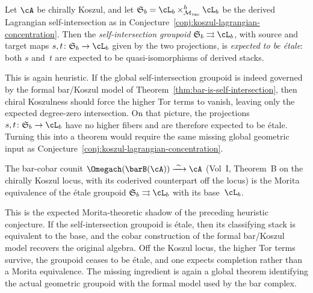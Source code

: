 \begin{conjecture}
\label{conj:etale-groupoid-koszul}
Let $\cA$ be chirally Koszul, and let
$\Steinb_b = \cL_b \times_{\Mvac}^h \cL_b$ be the derived
Lagrangian self-intersection as in
Conjecture~\textup{\ref{conj:koszul-lagrangian-concentration}}.
Then the \emph{self-intersection groupoid}
$\Steinb_b \rightrightarrows \cL_b$, with source and target maps
$s,t\colon \Steinb_b \to \cL_b$ given by the two projections, is
\emph{expected to be étale}: both $s$ and~$t$ are expected to be
quasi-isomorphisms of derived stacks.
\end{conjecture}

\begin{remark}[Evidence]
This is again heuristic. If the global self-intersection groupoid is
indeed governed by the formal bar/Koszul model of
Theorem~\ref{thm:bar-is-self-intersection}, then chiral Koszulness
should force the higher Tor terms to vanish, leaving only the expected
degree-zero intersection. On that picture, the projections
$s,t\colon \Steinb_b \to \cL_b$ have no higher fibers and are therefore
expected to be étale. Turning this into a theorem would require the
same missing global geometric input as
Conjecture~\ref{conj:koszul-lagrangian-concentration}.
\end{remark}

\begin{conjecture}
\label{conj:koszul-morita}
The bar-cobar counit
$\Omegach(\barB(\cA)) \xrightarrow{\;\sim\;} \cA$
\textup{(}Vol~I, Theorem~B on the chirally Koszul locus, with its
coderived counterpart off the locus\textup{)} is the Morita equivalence
of the étale groupoid $\Steinb_b \rightrightarrows \cL_b$
with its base~$\cL_b$.
\end{conjecture}

\begin{remark}[Evidence]
This is the expected Morita-theoretic shadow of the preceding
heuristic conjecture. If the self-intersection groupoid is étale,
then its classifying stack is equivalent to the base, and the cobar
construction of the formal bar/Koszul model recovers the original
algebra. Off the Koszul locus, the higher Tor terms survive, the
groupoid ceases to be étale, and one expects completion rather than a
Morita equivalence. The missing ingredient is again a global theorem
identifying the actual geometric groupoid with the formal model used by
the bar complex.
\end{remark}

